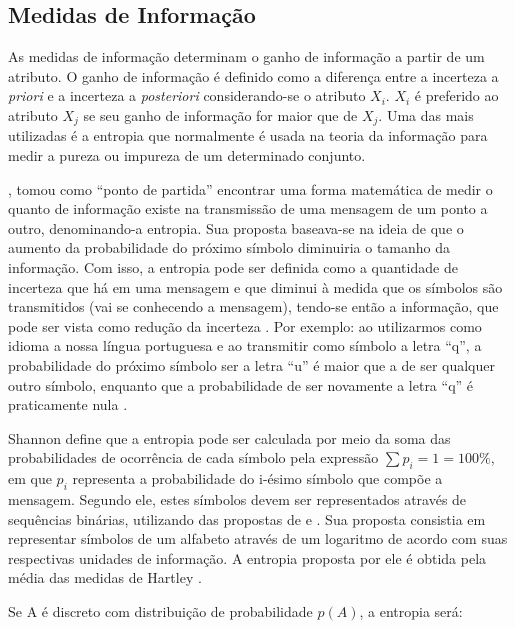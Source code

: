 \documentclass[
  openany]{book}
\begin{document}
\hypertarget{medinfo}{%
\subsection{Medidas de Informação}\label{medinfo}}

As medidas de informação determinam o ganho de informação a partir de um atributo. O ganho de informação é definido como a diferença entre a incerteza a \emph{priori} e a incerteza a \emph{posteriori} considerando-se o atributo \(X_i\). \(X_i\) é preferido ao atributo \(X_j\) se seu ganho de informação for maior que de \(X_j\). Uma das mais utilizadas é a entropia que normalmente é usada na teoria da informação para medir a pureza ou impureza de um determinado conjunto.

\citet{shannon1948mathematical}, tomou como ``ponto de partida'' encontrar uma forma matemática de medir o quanto de informação existe na transmissão de uma mensagem de um ponto a outro, denominando-a entropia. Sua proposta baseava-se na ideia de que o aumento da probabilidade do próximo símbolo diminuiria o tamanho da informação. Com isso, a entropia pode ser definida como a quantidade de incerteza que há em uma mensagem e que diminui à medida que os símbolos são transmitidos (vai se conhecendo a mensagem), tendo-se então a informação, que pode ser vista como redução da incerteza \citep{shannon1948mathematical, paviotti2019consideraccoes}. Por exemplo: ao utilizarmos como idioma a nossa língua portuguesa e ao transmitir como símbolo a letra ``q'', a probabilidade do próximo símbolo ser a letra ``u'' é maior que a de ser qualquer outro símbolo, enquanto que a probabilidade de ser novamente a letra ``q'' é praticamente nula \citep{paviotti2019consideraccoes}.

Shannon define que a entropia pode ser calculada por meio da soma das probabilidades de ocorrência de cada símbolo pela expressão \(∑ p_i = 1 = 100\%\), em que \(p_i\) representa a probabilidade do i-ésimo símbolo que compõe a mensagem. Segundo ele, estes símbolos devem ser representados através de sequências binárias, utilizando das propostas de \citet{nyquist1924certain} e \citet{hartley1928transmission}. Sua proposta consistia em representar símbolos de um alfabeto através de um logaritmo de acordo com suas respectivas unidades de informação. A entropia proposta por ele é obtida pela média das medidas de Hartley \citep{moser2012student}.

Se A é discreto com distribuição de probabilidade \(p(A)\), a entropia será:
\end{document}
